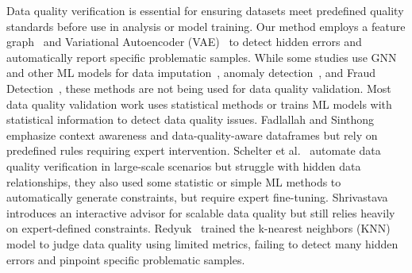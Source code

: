 Data quality verification is essential for ensuring datasets meet predefined quality standards before use in analysis or model training. 
Our method employs a feature graph~\cite{li2024graph} and Variational Autoencoder (VAE)~\cite{doersch2016tutorial} to detect hidden errors and automatically report specific problematic samples. 
While some studies use GNN and other ML models for data imputation~\cite{telyatnikov2023egg,cappuzzo2024relational,spinelli2020missing}, anomaly detection~\cite{du2022graph}, and Fraud Detection~\cite{rao2020xfraud,liu2021pick}, these methods are not being used for data quality validation. 
Most data quality validation work uses statistical methods or trains ML models with statistical information to detect data quality issues.
Fadlallah and Sinthong~\cite{fadlallah2023context,sinthong2021dqdf} emphasize context awareness and data-quality-aware dataframes but rely on predefined rules requiring expert intervention. Schelter et al.~\cite{schelter2018automating, schelter2019differential, caveness2020tensorflow} automate data quality verification in large-scale scenarios but struggle with hidden data relationships, they also used some statistic or simple ML methods to automatically generate constraints, but require expert fine-tuning. Shrivastava~\cite{shrivastava2019dqa} introduces an interactive advisor for scalable data quality but still relies heavily on expert-defined constraints. Redyuk~\cite{redyuk2021automating} trained the k-nearest neighbors (KNN)~\cite{peterson2009k} model to judge data quality using limited metrics, failing to detect many hidden errors and pinpoint specific problematic samples. %


